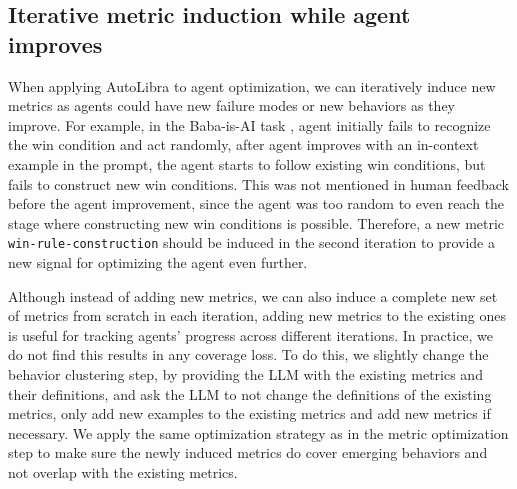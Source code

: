 \subsection{Iterative metric induction while agent improves}
\label{sec:iterative-induction}
When applying AutoLibra to agent optimization, we can iteratively induce new metrics as agents could
have new failure modes or new behaviors as they improve.
For example, in the Baba-is-AI task \citep[\S\ref{sec:baba-is-ai}]{cloos2024babaaibreakrules},
agent initially fails to recognize the win condition and act randomly,
after agent improves with an in-context example in the prompt, the agent starts to 
follow existing win conditions, but fails to construct new win conditions.
This was not mentioned in human feedback before the agent improvement, since the agent
was too random to even reach the stage where constructing new win conditions is possible.
Therefore, a new metric \texttt{win-rule-construction} should be induced in the second iteration 
to provide a new signal for optimizing the agent even further.

Although instead of adding new metrics, we can also induce a complete new set of metrics from scratch
in each iteration, adding new metrics to the existing ones is useful for tracking agents' progress
across different iterations. In practice, we do not find this results in any coverage loss. 
To do this, we slightly change the behavior clustering step, by providing the LLM with the existing metrics
and their definitions, and ask the LLM to not change the definitions of the existing metrics, 
only add new examples to the existing metrics and add new metrics if necessary.
We apply the same optimization strategy as in the metric optimization step
to make sure the newly induced metrics do cover emerging behaviors and not overlap with the existing metrics.
